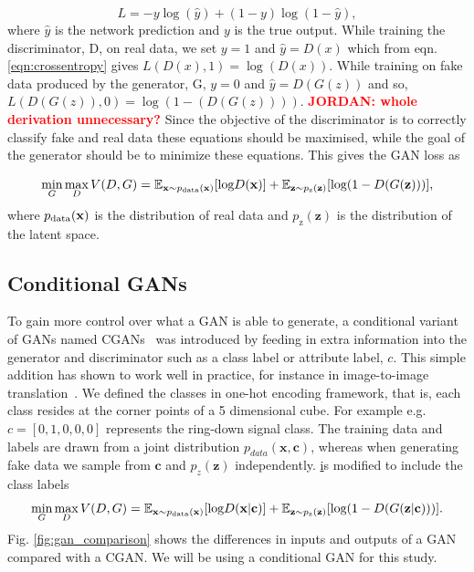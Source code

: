 \documentclass[12pt]{iopart}
\newcommand{\jordan}[1]{\textbf{\textcolor{red}{JORDAN: #1}}}
\begin{document}
\begin{equation}
    L = -y \log(\hat{y}) + (1 - y) \log(1-\hat{y}),
    \label{eqn:crossentropy}
\end{equation}
where $\hat{y}$ is the network prediction and $y$ is the true output. While training the discriminator, D, on real data, we set $y = 1$ and $\hat{y} = D(x)$ which from eqn. \ref{eqn:crossentropy} gives $L(D(x),1) = \log(D(x))$. While training on fake data produced by the generator, G, $y = 0$ and $\hat{y} = D(G(z))$ and so, $L(D(G(z)),0) = \log(1-(D(G(z))))$. \jordan{whole derivation unnecessary?} Since the objective of the discriminator is to correctly classify fake and real data these equations should be maximised, while the goal of the generator should be to minimize these equations. This gives the \ac{GAN} loss as

\begin{equation}
   \mathop{\text{min}}_{G}  \mathop{\text{max}}_{D} V(D,G) = \mathbb{E}_{\mathbf{x} \sim p_{\text{\text{data}}}(\mathbf{x})} [\text{log} D(\mathbf{x})] + \mathbb{E}_{\mathbf{z} \sim p_{\text{z}}(\mathbf{z})} [\text{log}(1-D(G(\mathbf{z})))],
 \label{equation:GANloss}
 \end{equation}
where $p_{\text{\text{data}}}(\mathbf{x})$ is the distribution of real data and $p_{\text{z}}(\mathbf{z})$ is the distribution of the latent space. 

\subsection{Conditional GANs}

%
To gain more control over what a GAN is able to generate, a conditional variant
of \acp{GAN} named \acp{CGAN}~\cite{cgan} was introduced by feeding in extra
information into the generator and discriminator such as a class label or
attribute label, $c$. This simple addition has shown to work well in practice, for instance in image-to-image translation~\cite{isola2016imagetoimage}. We defined the classes in one-hot encoding framework, that is, each class resides at the corner points of a 5 dimensional cube. For example e.g. $c=[0,1,0,0,0]$ represents the ring-down signal class. The training data and labels are drawn from a joint distribution $p_{data}(\mathbf{x},\mathbf{c})$, whereas when generating fake data we sample from $\mathbf{c}$ and $p_{z}(\mathbf{z})$ independently. \href{equation:GANloss} is modified to include the class labels 
~
\begin{equation}
   \mathop{\text{min}}_{G}  \mathop{\text{max}}_{D} V(D,G) = \mathbb{E}_{\mathbf{x} \sim p_{\text{\text{data}}}(\mathbf{x})} [\text{log} D(\mathbf{x|c})] + \mathbb{E}_{\mathbf{z} \sim p_{\text{z}}(\mathbf{z})} [\text{log}(1-D(G(\mathbf{z|c})))].
 \label{equation:CGANloss}
 \end{equation}
Fig. \ref{fig:gan_comparison} shows the differences in inputs and outputs of a GAN compared with a \ac{CGAN}. We will be using a conditional GAN for this study.
\end{document}
